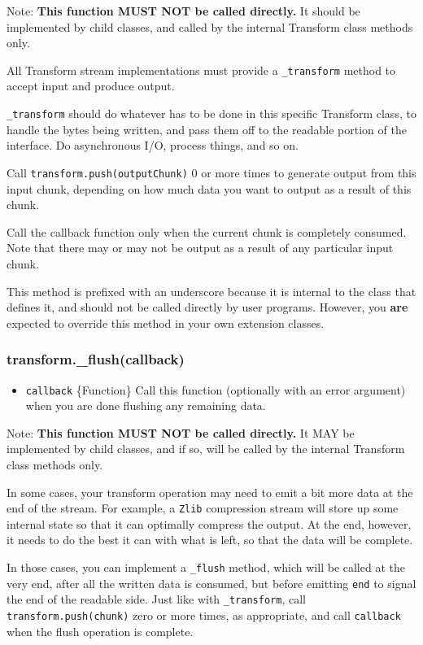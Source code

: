 Note: \textbf{This function MUST NOT be called directly.} It should be
implemented by child classes, and called by the internal Transform class
methods only.

All Transform stream implementations must provide a \texttt{\_transform}
method to accept input and produce output.

\texttt{\_transform} should do whatever has to be done in this specific
Transform class, to handle the bytes being written, and pass them off to
the readable portion of the interface. Do asynchronous I/O, process
things, and so on.

Call \texttt{transform.push(outputChunk)} 0 or more times to generate
output from this input chunk, depending on how much data you want to
output as a result of this chunk.

Call the callback function only when the current chunk is completely
consumed. Note that there may or may not be output as a result of any
particular input chunk.

This method is prefixed with an underscore because it is internal to the
class that defines it, and should not be called directly by user
programs. However, you \textbf{are} expected to override this method in
your own extension classes.

\subsubsection{transform.\_flush(callback)}

\begin{itemize}
\item
  \texttt{callback} \{Function\} Call this function (optionally with an
  error argument) when you are done flushing any remaining data.
\end{itemize}

Note: \textbf{This function MUST NOT be called directly.} It MAY be
implemented by child classes, and if so, will be called by the internal
Transform class methods only.

In some cases, your transform operation may need to emit a bit more data
at the end of the stream. For example, a \texttt{Zlib} compression
stream will store up some internal state so that it can optimally
compress the output. At the end, however, it needs to do the best it can
with what is left, so that the data will be complete.

In those cases, you can implement a \texttt{\_flush} method, which will
be called at the very end, after all the written data is consumed, but
before emitting \texttt{end} to signal the end of the readable side.
Just like with \texttt{\_transform}, call \texttt{transform.push(chunk)}
zero or more times, as appropriate, and call \texttt{callback} when the
flush operation is complete.


